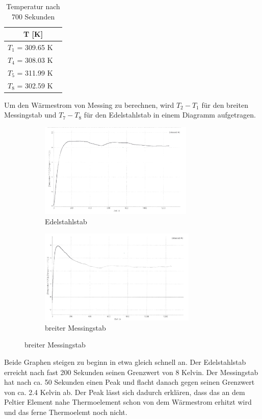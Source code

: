\begin{table}
	\centering
	\caption{Temperatur nach 700 Sekunden}
	\label{tab:kelv}
	\begin{tabular}{c}
		\toprule
		T [K] \\
		\midrule
		$T_1$ = 309.65 K \ \\
		$T_4$ = 308.03 K \ \\
		$T_5$ = 311.99 K \ \\
		$T_8$ = 302.59 K \ \\
		\bottomrule
	\end{tabular}
\end{table}
Um den Wärmestrom von Messing zu berechnen, wird  $T_2 - T_1$ für den breiten Messingstab und $T_7 - T_8$ für den Edelstahlstab in einem Diagramm aufgetragen.\ 
\begin{figure}
	\centering
	\caption{Temperaturdifferenz}
	\begin{subfigure}{0.48\textwidth}
		\centering
		\includegraphics[height=4.5cm]{./Graph_6.png}
		\caption{Edelstahlstab}
	\end{subfigure}
	\begin{subfigure}{0.48\textwidth}
		\centering
                \includegraphics[height=4.5cm]{./Graph_7.png}
                \caption{breiter Messingstab}
        \end{subfigure}
\end{figure}
Beide Graphen steigen zu beginn in etwa gleich schnell an. Der Edelstahlstab erreicht nach fast 200 Sekunden seinen Grenzwert von 8 Kelvin. Der Messingstab hat nach ca. 50 Sekunden einen Peak und flacht danach gegen seinen Grenzwert von ca. 2.4 Kelvin ab. Der Peak lässt sich dadurch erklären, dass das an dem Peltier Element nahe Thermoelement schon von dem Wärmestrom erhitzt wird und das ferne Thermoelemt noch nicht.
